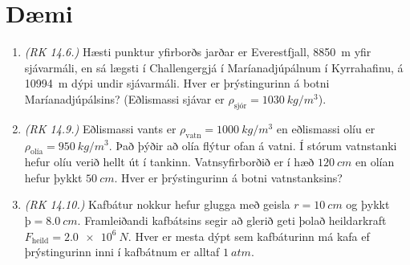 \newpage

\section{Dæmi}

\begin{enumerate}[label = \textbf{Dæmi \thechapter.\arabic*.}]

\subsection*{Þrýstingur}

\item \textit{(RK 14.6.)} Hæsti punktur yfirborðs jarðar er Everestfjall, \SI{8850}{m} yfir sjávarmáli, en sá lægsti í Challengergjá í Maríanadjúpálnum í Kyrrahafinu, á \SI{10994}{m} dýpi undir sjávarmáli. Hver er þrýstingurinn á botni Maríanadjúpálsins? (Eðlismassi sjávar er $\rho_{\text{sjór}} = \SI{1030}{kg/m^3}$).

\item \textit{(RK 14.9.)} Eðlismassi vants er $\rho_{\text{vatn}} = \SI{1000}{kg/m^3}$ en eðlismassi olíu er $\rho_{\text{olía}} = \SI{950}{kg/m^3}$. Það þýðir að olía flýtur ofan á vatni. Í stórum vatnstanki hefur olíu verið hellt út í tankinn. Vatnsyfirborðið er í hæð $\SI{120}{cm}$ en olían hefur þykkt $\SI{50}{cm}$. Hver er þrýstingurinn á botni vatnstanksins?

\item \textit{(RK 14.10.)} Kafbátur nokkur hefur glugga með geisla $r = \SI{10}{cm}$ og þykkt $þ = \SI{8.0}{cm}$. Framleiðandi kafbátsins segir að glerið geti þolað heildarkraft $F_{\text{heild}} = \SI{2.0e6}{N}$. Hver er mesta dýpt sem kafbáturinn má kafa ef þrýstingurinn inni í kafbátnum er alltaf $\SI{1}{atm}$.


\end{enumerate}
